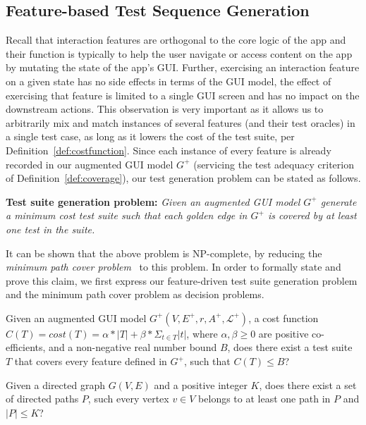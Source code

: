 \subsection{Feature-based Test Sequence Generation}
\label{sec:traversalAlgo}

Recall that interaction features are orthogonal to the core logic of the app and their function is typically to help the user navigate or access content on the app by mutating the state of the app's GUI. Further, exercising an interaction feature on a given state has no side effects in terms of the GUI model, \ie the effect of exercising that feature is limited to a single GUI screen and has no impact on the downstream actions. This observation is very important as it allows us to arbitrarily mix and match instances of several features (and their test oracles) in a single test case, as long as it lowers the cost of the test suite, per Definition~\ref{def:costfunction}. Since each instance of every feature is already recorded in our augmented GUI model $G^+$ (servicing the test adequacy criterion of Definition~\ref{def:coverage}), our test generation problem can be stated as follows.

\noindent\textbf{Test suite generation problem:} \textit{Given an augmented GUI model $G^+$ generate a minimum cost test suite such that each golden edge in $G^+$ is covered by at least one test in the suite.}

It can be shown that the above problem is NP-complete, by reducing the \textit{minimum path cover problem}~\cite{PathCover:NtafosH79} to this problem. In order to formally state and prove this claim, we first express our feature-driven test suite generation problem and the minimum path cover problem as decision problems.

\begin{mydef}
Given an augmented GUI model $G^+(V, E^+, r, A^+, \mathcal{L}^+)$, a cost function $C(T) = cost(T) = \alpha * |T| + \beta * \Sigma_{t \in T} |t|$, where $\alpha, \beta \geq 0$ are positive co-efficients, and a non-negative real number bound $B$, does there exist a test suite $T$ that covers every feature defined in $G^+$, such that $C(T) \leq B$?
\end{mydef}

\begin{mydef}
Given a directed graph $G(V,E)$ and a positive integer $K$, does there exist a set of directed paths $P$, such every vertex $v \in V$ belongs to at least one path in $P$ and $|P| \leq K$?
\end{mydef}

